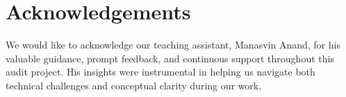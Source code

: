 \chapter*{\centering Acknowledgements}
\quad We would like to acknowledge our teaching assistant, Manasvin Anand, for his valuable guidance, prompt feedback, and continuous support throughout this audit project. His insights were instrumental in helping us navigate both technical challenges and conceptual clarity during our work.

